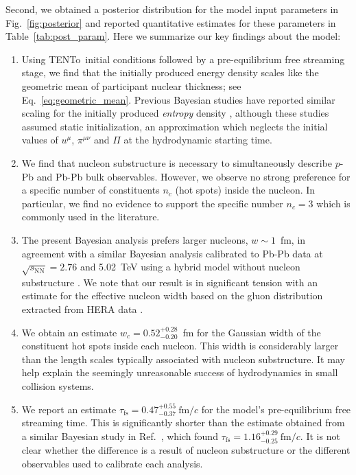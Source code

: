 \documentclass[aps,prc,reprint,amsmath,nofootinbib]{revtex4-1}
\newcommand{\trento}{T\raisebox{-0.5ex}{R}ENTo}
\newcommand{\sqrts}{\sqrt{s_\mathrm{NN}}}
\newcommand{\fmc}{\ensuremath{\text{fm}/c}}
\newcommand{\taufs}{\tau_\text{fs}}
\newcommand{\nc}{n_c}
\newcommand{\wc}{w_c}
\begin{document}
Second, we obtained a posterior distribution for the model input parameters in Fig.~\ref{fig:posterior} and reported quantitative estimates for these parameters in Table~\ref{tab:post_param}.
Here we summarize our key findings about the model:
\begin{enumerate}[itemsep=0pt, leftmargin=2\parindent]
  \item
    Using \trento\ initial conditions followed by a pre-equilibrium free streaming stage, we find that the initially produced energy density scales like the geometric mean of participant nuclear thickness; see Eq.~\eqref{eq:geometric_mean}.
    Previous Bayesian studies have reported similar scaling for the initially produced \emph{entropy} density \cite{Bernhard:2016tnd, Ke:2016jrd}, although these studies assumed static initialization, an approximation which neglects the initial values of $u^\mu$, $\pi^{\mu\nu}$ and $\Pi$ at the hydrodynamic starting time.
  \item
    We find that nucleon substructure is necessary to simultaneously describe $p$-Pb and Pb-Pb bulk observables.
    However, we observe no strong preference for a specific number of constituents $\nc$ (hot spots) inside the nucleon.
    In particular, we find no evidence to support the specific number $\nc=3$ which is commonly used in the literature.
  \item
    The present Bayesian analysis prefers larger nucleons, $w \sim 1$~fm, in agreement with a similar Bayesian analysis calibrated to Pb-Pb data at $\sqrts=2.76$ and 5.02~TeV using a hybrid model without nucleon substructure \cite{Bernhard:2018hnz}.
    We note that our result is in significant tension with an estimate for the effective nucleon width based on the gluon distribution extracted from HERA data \cite{Rezaeian:2012ji}.
  \item
    We obtain an estimate $\wc=0.52_{-0.20}^{+0.28}$~fm for the Gaussian width of the constituent hot spots inside each nucleon.
    This width is considerably larger than the length scales typically associated with nucleon substructure.
    It may help explain the seemingly unreasonable success of hydrodynamics in small collision systems.
  \item
    We report an estimate $\taufs=0.47_{-0.37}^{+0.55}~\fmc$ for the model's pre-equilibrium free streaming time.
    This is significantly shorter than the estimate obtained from a similar Bayesian study in Ref.~\cite{Bernhard:2018hnz}, which found $\taufs=1.16_{-0.25}^{+0.29}~\fmc$.
    It is not clear whether the difference is a result of nucleon substructure or the different observables used to calibrate each analysis.

\end{enumerate}
\end{document}
